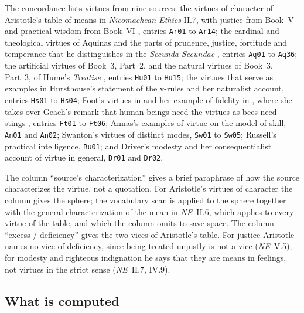 \documentclass{situationist-preprint}
\begin{document}
The concordance lists \stnconc{} virtues from nine sources: the virtues of character of Aristotle's table of means in \emph{Nicomachean Ethics} II.7, with justice from Book~V and practical wisdom from Book~VI \citep{AristotleNE}, entries \texttt{Ar01} to \texttt{Ar14}; the cardinal and theological virtues of Aquinas and the parts of prudence, justice, fortitude and temperance that he distinguishes in the \emph{Secunda Secundae} \citep{AquinasST}, entries \texttt{Aq01} to \texttt{Aq36}; the artificial virtues of Book~3, Part~2, and the natural virtues of Book~3, Part~3, of Hume's \emph{Treatise} \citep{Hume1739}, entries \texttt{Hu01} to \texttt{Hu15}; the virtues that serve as examples in Hursthouse's statement of the v-rules and her naturalist account, entries \texttt{Hs01} to \texttt{Hs04}; Foot's virtues in \citet{Foot1978} and her example of fidelity in \citet{Foot2001}, where she takes over Geach's remark that human beings need the virtues as bees need stings \citep{Geach1977}, entries \texttt{Ft01} to \texttt{Ft06}; Annas's examples of virtue on the model of skill, \texttt{An01} and \texttt{An02}; Swanton's virtues of distinct modes, \texttt{Sw01} to \texttt{Sw05}; Russell's practical intelligence, \texttt{Ru01}; and Driver's modesty and her consequentialist account of virtue in general, \texttt{Dr01} and \texttt{Dr02}.

The column \enquote{source's characterization} gives a brief paraphrase of how the source characterizes the virtue, not a quotation. For Aristotle's virtues of character the column gives the sphere; the vocabulary scan is applied to the sphere together with the general characterization of the mean in \emph{NE}~II.6, which applies to every virtue of the table, and which the column omits to save space. The column \enquote{excess / deficiency} gives the two vices of Aristotle's table. For justice Aristotle names no vice of deficiency, since being treated unjustly is not a vice (\emph{NE}~V.5); for modesty and righteous indignation he says that they are means in feelings, not virtues in the strict sense (\emph{NE}~II.7, IV.9).

\subsection*{What is computed}
\end{document}
